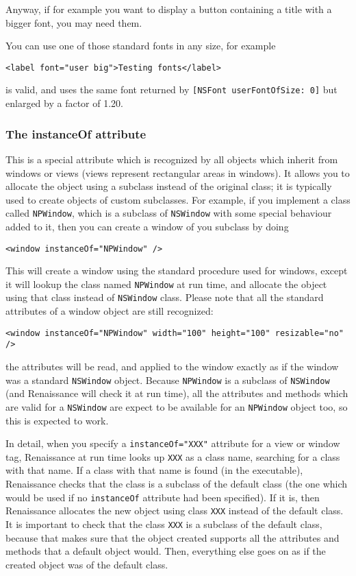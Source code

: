 Anyway, if for example you want to display a button containing a title
with a bigger font, you may need them.

You can use one of those standard fonts in any size, for example
\begin{verbatim}
<label font="user big">Testing fonts</label>
\end{verbatim}
is valid, and uses the same font returned by \texttt{[NSFont
userFontOfSize: 0]} but enlarged by a factor of 1.20.

\subsubsection{The instanceOf attribute}
This is a special attribute which is recognized by all objects which
inherit from windows or views (views represent rectangular areas in
windows).  It allows you to allocate the object using a subclass
instead of the original class; it is typically used to create objects
of custom subclasses.  For example, if you implement a class called
\texttt{NPWindow}, which is a subclass of \texttt{NSWindow} with some
special behaviour added to it, then you can create a window of you
subclass by doing
\begin{verbatim}
<window instanceOf="NPWindow" />
\end{verbatim}
This will create a window using the standard procedure used for
windows, except it will lookup the class named \texttt{NPWindow} at
run time, and allocate the object using that class instead of
\texttt{NSWindow} class.  Please note that all the standard attributes
of a window object are still recognized:
\begin{verbatim}
<window instanceOf="NPWindow" width="100" height="100" resizable="no" />
\end{verbatim}
the attributes will be read, and applied to the window exactly as if
the window was a standard \texttt{NSWindow} object.  Because
\texttt{NPWindow} is a subclass of \texttt{NSWindow} (and Renaissance
will check it at run time), all the attributes and methods which are
valid for a \texttt{NSWindow} are expect to be available for an
\texttt{NPWindow} object too, so this is expected to work.

In detail, when you specify a \texttt{instanceOf="XXX"} attribute for a
view or window tag, Renaissance at run time looks up \texttt{XXX} as a
class name, searching for a class with that name.  If a class with
that name is found (in the executable), Renaissance checks that the
class is a subclass of the default class (the one which would be used
if no \texttt{instanceOf} attribute had been specified).  If it is, then
Renaissance allocates the new object using class \texttt{XXX} instead
of the default class.  It is important to check that the class
\texttt{XXX} is a subclass of the default class, because that makes sure
that the object created supports all the attributes and methods that a
default object would.  Then, everything else goes on as if the created
object was of the default class.

